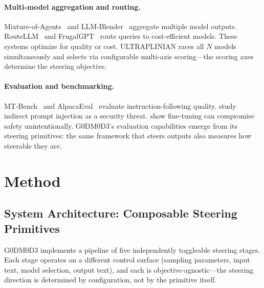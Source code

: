 \documentclass[11pt]{article}
\begin{document}
\paragraph{Multi-model aggregation and routing.}
Mixture-of-Agents~\cite{wang2024mixture} and LLM-Blender~\cite{jiang2023llmblender} aggregate multiple model outputs. RouteLLM~\cite{ong2024routellm} and FrugalGPT~\cite{chen2023frugalgpt} route queries to cost-efficient models. These systems optimize for quality or cost. ULTRAPLINIAN races all $N$ models simultaneously and selects via configurable multi-axis scoring---the scoring axes determine the steering objective.

\paragraph{Evaluation and benchmarking.}
MT-Bench~\cite{zheng2024judging} and AlpacaEval~\cite{li2023alpacaeval} evaluate instruction-following quality. \citet{greshake2023not} study indirect prompt injection as a security threat. \citet{qi2024finetuning} show fine-tuning can compromise safety unintentionally. G0DM0D3's evaluation capabilities emerge from its steering primitives: the same framework that steers outputs also measures how steerable they are.

\section{Method}
\label{sec:method}

\subsection{System Architecture: Composable Steering Primitives}

G0DM0D3 implements a pipeline of five independently toggleable steering stages. Each stage operates on a different control surface (sampling parameters, input text, model selection, output text), and each is objective-agnostic---the steering direction is determined by configuration, not by the primitive itself.
\end{document}

